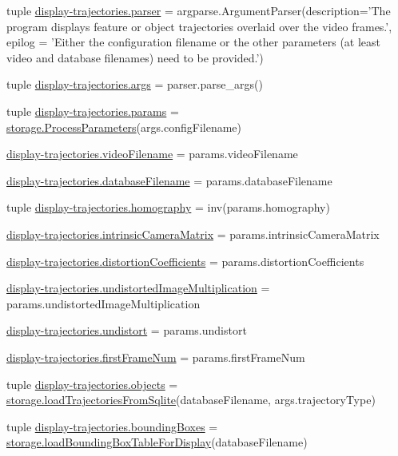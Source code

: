 \begin{DoxyCompactItemize}
\item 
tuple \hyperlink{namespacedisplay-trajectories_ae474cf08ec327159b17d0b6ae3e64602}{display-\/trajectories.\-parser} = argparse.\-Argument\-Parser(description='The program displays feature or object trajectories overlaid over the video frames.', epilog = 'Either the configuration filename or the other parameters (at least video and database filenames) need to be provided.')
\item 
tuple \hyperlink{namespacedisplay-trajectories_aa96131c1a01682890e5a1d26bc810234}{display-\/trajectories.\-args} = parser.\-parse\-\_\-args()
\item 
tuple \hyperlink{namespacedisplay-trajectories_af9fd82e2edc80c974749eadfb0d1570a}{display-\/trajectories.\-params} = \hyperlink{classstorage_1_1ProcessParameters}{storage.\-Process\-Parameters}(args.\-config\-Filename)
\item 
\hyperlink{namespacedisplay-trajectories_ac49ed52409b0ea70ec785d5d511ba23d}{display-\/trajectories.\-video\-Filename} = params.\-video\-Filename
\item 
\hyperlink{namespacedisplay-trajectories_a43b07df78fee39f08977f07a606d4b32}{display-\/trajectories.\-database\-Filename} = params.\-database\-Filename
\item 
tuple \hyperlink{namespacedisplay-trajectories_af552b3670a92c4887839b96ffddcffa6}{display-\/trajectories.\-homography} = inv(params.\-homography)
\item 
\hyperlink{namespacedisplay-trajectories_ac1160412f43bb2d12b5a99af69632f18}{display-\/trajectories.\-intrinsic\-Camera\-Matrix} = params.\-intrinsic\-Camera\-Matrix
\item 
\hyperlink{namespacedisplay-trajectories_a4bc3c259d628ba2e71c96e346789824c}{display-\/trajectories.\-distortion\-Coefficients} = params.\-distortion\-Coefficients
\item 
\hyperlink{namespacedisplay-trajectories_a7ba37ec5f26e7111c0120702cab55085}{display-\/trajectories.\-undistorted\-Image\-Multiplication} = params.\-undistorted\-Image\-Multiplication
\item 
\hyperlink{namespacedisplay-trajectories_a252ba7661bb1423b9fb3404b78b2efb9}{display-\/trajectories.\-undistort} = params.\-undistort
\item 
\hyperlink{namespacedisplay-trajectories_aee5d40a05c18b868da1967c3f7b96047}{display-\/trajectories.\-first\-Frame\-Num} = params.\-first\-Frame\-Num
\item 
tuple \hyperlink{namespacedisplay-trajectories_a010c5bc128d9c1d72f41939d06616bbf}{display-\/trajectories.\-objects} = \hyperlink{namespacestorage_aaafba9f6bc0816ff0084df5e1d892a9d}{storage.\-load\-Trajectories\-From\-Sqlite}(database\-Filename, args.\-trajectory\-Type)
\item 
tuple \hyperlink{namespacedisplay-trajectories_a006e51ba4b107177564f50f940d5f87d}{display-\/trajectories.\-bounding\-Boxes} = \hyperlink{namespacestorage_a651d604c13f73a8d00f8848f2b376d90}{storage.\-load\-Bounding\-Box\-Table\-For\-Display}(database\-Filename)
\end{DoxyCompactItemize}
